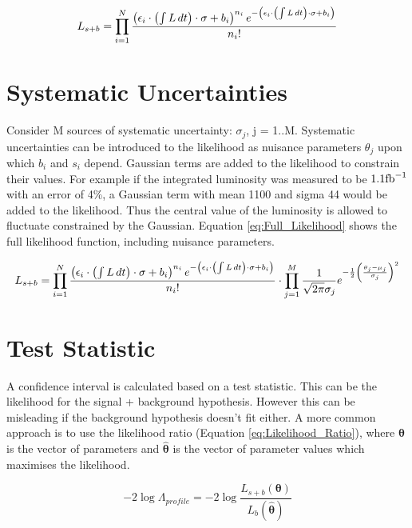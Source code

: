 \begin{equation}
L_{s+b} = \prod_{i=1}^{N}
\frac{\left(\epsilon_{i} \cdot \left(\int L\,dt\right) \cdot \sigma+b_{i}\right)^{n_{i}}e^{-\left(\epsilon_{i} \cdot \left(\int L\,dt\right) \cdot \sigma+b_{i}\right)}}{n_{i}!} 
\label{eq:SignalPlusBackground_Rewritten}
\end{equation}

\section{Systematic Uncertainties}

Consider M sources of systematic uncertainty: $\sigma_{j}$, j = 1..M. Systematic
uncertainties can be introduced to the likelihood as nuisance parameters 
$\theta_{j}$ upon which $b_{i}$ and $s_{i}$ depend. Gaussian terms are added to 
the likelihood to constrain their values. For example if the integrated 
luminosity was measured to be $1.1 \mbox{fb}^{-1}$ with an error of 4\%, a Gaussian term 
with mean 1100 and sigma 44 would be added to the likelihood. Thus the central
value of the luminosity is allowed to fluctuate constrained by the Gaussian.
Equation \ref{eq:Full_Likelihood} shows the full likelihood function, including 
nuisance parameters. 

\begin{equation}
L_{s+b} = \prod_{i=1}^{N}
\frac{\left(\epsilon_{i} \cdot \left(\int L\,dt\right) \cdot \sigma+b_{i}\right)^{n_{i}}e^{-\left(\epsilon_{i} \cdot \left(\int L\,dt\right) \cdot \sigma+b_{i}\right)}}{n_{i}!} 
\cdot \prod_{j=1}^{M} \frac{1}{\sqrt{2\pi}\sigma_{j}}e^{-\frac{1}{2}\left(\frac{\theta_{j} - \mu_{j}}{\sigma_{j}}\right)^{2}} 
\label{eq:Full_Likelihood}
\end{equation}

\section{Test Statistic}

A confidence interval is calculated based on a test statistic. This can be the 
likelihood for the signal + background hypothesis. However this can be misleading
if the background hypothesis doesn't fit either. A more common approach is to 
use the likelihood ratio (Equation \ref{eq:Likelihood_Ratio}), where 
$\boldsymbol\theta$ is the vector of parameters and $\hat{\boldsymbol\theta}$
is the vector of parameter values which maximises the likelihood. 

\begin{equation}
-2\log\Lambda_{profile} = -2\log\frac{L_{s+b}(\boldsymbol\theta)}{L_{b}(\hat{\boldsymbol\theta})}
\label{eq:Likelihood_Ratio}
\end{equation}

